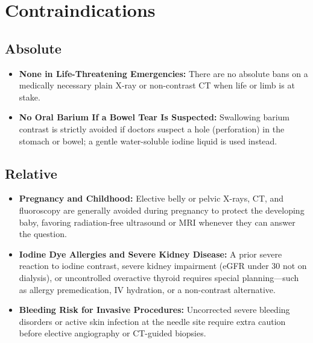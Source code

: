 \section{Contraindications}

\subsection{Absolute}
\begin{itemize}
  \item \textbf{None in Life-Threatening Emergencies:} There are no absolute bans on a medically necessary plain X-ray or non-contrast CT when life or limb is at stake.
  \item \textbf{No Oral Barium If a Bowel Tear Is Suspected:} Swallowing barium contrast is strictly avoided if doctors suspect a hole (perforation) in the stomach or bowel; a gentle water-soluble iodine liquid is used instead.
\end{itemize}

\subsection{Relative}
\begin{itemize}
  \item \textbf{Pregnancy and Childhood:} Elective belly or pelvic X-rays, CT, and fluoroscopy are generally avoided during pregnancy to protect the developing baby, favoring radiation-free ultrasound or MRI whenever they can answer the question.
  \item \textbf{Iodine Dye Allergies and Severe Kidney Disease:} A prior severe reaction to iodine contrast, severe kidney impairment (eGFR under 30 not on dialysis), or uncontrolled overactive thyroid requires special planning---such as allergy premedication, IV hydration, or a non-contrast alternative.
  \item \textbf{Bleeding Risk for Invasive Procedures:} Uncorrected severe bleeding disorders or active skin infection at the needle site require extra caution before elective angiography or CT-guided biopsies.
\end{itemize}


